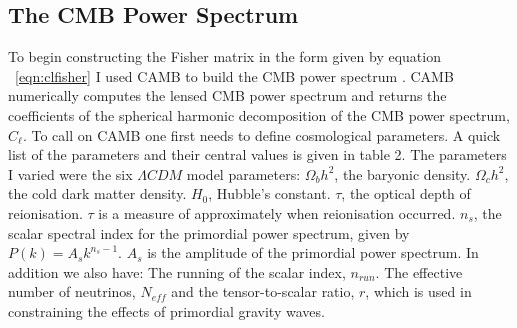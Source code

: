 \subsection{The CMB Power Spectrum}

To begin constructing the Fisher matrix in the form given by equation ~\ref{eqn:clfisher} I used CAMB to build the CMB power spectrum \cite{Challinor:2005jy}. CAMB numerically computes the lensed CMB power spectrum and returns the coefficients of the spherical harmonic decomposition of the CMB power spectrum, $C_{\ell}$. To call on CAMB one first needs to define cosmological parameters. A quick list of the parameters and their central values is given in table 2. The parameters I varied were the six $\Lambda CDM$ model parameters: $\Omega_{b}h^{2}$, the baryonic density. $\Omega_{c}h^{2}$, the cold dark matter density. $H_0$, Hubble's constant. $\tau$, the optical depth of reionisation. $\tau$ is a measure of approximately when reionisation occurred. $n_s$, the scalar spectral index for the primordial power spectrum, given by $P(k) = A_s k^{n_s - 1}$. $A_s$ is the amplitude of the primordial power spectrum. In addition we also have: The running of the scalar index, $n_{run}$. The effective number of neutrinos, $N_{eff}$ and the tensor-to-scalar ratio, $r$, which is used in constraining the effects of primordial gravity waves.

